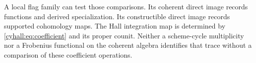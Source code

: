 A local flag family can test those comparisons. Its coherent
direct image records functions and derived specialization. Its
constructible direct image records supported cohomology maps.
The Hall integration map is determined by
\eqref{cyhall:eq:coefficient} and its proper counit.
Neither a scheme-cycle multiplicity nor a Frobenius functional
on the coherent algebra identifies that trace without a
comparison of these coefficient operations.
